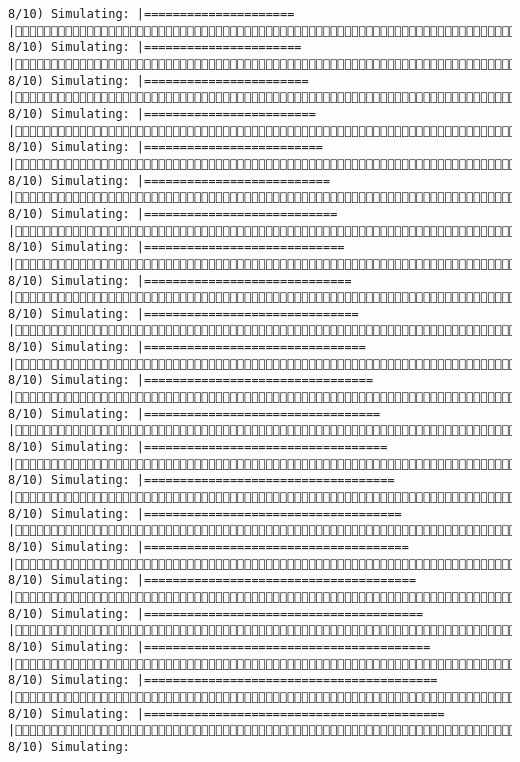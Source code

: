 \documentclass[]{article}
\begin{document}
\begin{verbatim}
8/10) Simulating: |=====================                                |( 8/10) Simulating: |======================                               |( 8/10) Simulating: |=======================                              |( 8/10) Simulating: |========================                             |( 8/10) Simulating: |=========================                            |( 8/10) Simulating: |==========================                           |( 8/10) Simulating: |===========================                          |( 8/10) Simulating: |============================                         |( 8/10) Simulating: |=============================                        |( 8/10) Simulating: |==============================                       |( 8/10) Simulating: |===============================                      |( 8/10) Simulating: |================================                     |( 8/10) Simulating: |=================================                    |( 8/10) Simulating: |==================================                   |( 8/10) Simulating: |===================================                  |( 8/10) Simulating: |====================================                 |( 8/10) Simulating: |=====================================                |( 8/10) Simulating: |======================================               |( 8/10) Simulating: |=======================================              |( 8/10) Simulating: |========================================             |( 8/10) Simulating: |=========================================            |( 8/10) Simulating: |==========================================           |( 8/10) Simulating: 
\end{verbatim}
\end{document}
